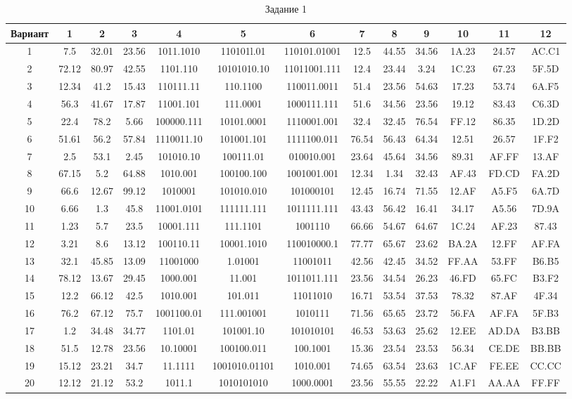 \begin{table}
  \caption{Задание 1}
  \begin{center}\label{tab:task2_1}
\begin{tabular}{|c|c|c|c|c|c|c|c|c|c|c|c|c|}
\hline
Вариант & 1 & 2 & 3 & 4 & 5 & 6 & 7 & 8 & 9 & 10 & 11 & 12\tabularnewline
\hline
1 & 7.5 & 32.01 & 23.56 & 1011.1010 & 110101l.01 & 110101.01001 & 12.5 & 44.55 & 34.56 & 1A.23 & 24.57 & AC.C1\tabularnewline
\hline
2 & 72.12 & 80.97 & 42.55 & 1101.110 & 10101010.10 & 11011001.111 & 12.4 & 23.44 & 3.24 & 1C.23 & 67.23 & 5F.5D\tabularnewline
\hline
3 & 12.34 & 41.2 & 15.43 & 110111.11 & 110.1100 & 110011.0011 & 51.4 & 23.56 & 54.63 & 17.23 & 53.74 & 6A.F5\tabularnewline
\hline
4 & 56.3 & 41.67 & 17.87 & 11001.101 & 111.0001 & 1000111.111 & 51.6 & 34.56 & 23.56 & 19.12 & 83.43 & C6.3D\tabularnewline
\hline
5 & 22.4 & 78.2 & 5.66 & 100000.111 & 10101.0001 & 1110001.001 & 32.4 & 32.45 & 76.54 & FF.12 & 86.35 & 1D.2D\tabularnewline
\hline
6 & 51.61 & 56.2 & 57.84 & 1110011.10 & 101001.101 & 1111100.011 & 76.54 & 56.43 & 64.34 & 12.51 & 26.57 & 1F.F2\tabularnewline
\hline
7 & 2.5 & 53.1 & 2.45 & 101010.10 & 100111.01 & 010010.001 & 23.64 & 45.64 & 34.56 & 89.31 & AF.FF & 13.AF\tabularnewline
\hline
8 & 67.15 & 5.2 & 64.88 & 1010.001 & 100100.100 & 1001001.001 & 12.34 & 1.34 & 32.43 & AF.43 & FD.CD & FA.2D\tabularnewline
\hline
9 & 66.6 & 12.67 & 99.12 & 1010001 & 101010.010 & 101000101 & 12.45 & 16.74 & 71.55 & 12.AF & A5.F5 & 6A.7D\tabularnewline
\hline
10 & 6.66 & 1.3 & 45.8 & 11001.0101 & 111111.111 & 1011111.111 & 43.43 & 56.42 & 16.41 & 34.17 & A5.56 & 7D.9A\tabularnewline
\hline
11 & 1.23 & 5.7 & 23.5 & 10001.111 & 111.1101 & 1001110 & 66.66 & 54.67 & 64.67 & 1C.24 & AF.23 & 87.43\tabularnewline
\hline
12 & 3.21 & 8.6 & 13.12 & 100110.11 & 10001.1010 & 110010000.1 & 77.77 & 65.67 & 23.62 & BA.2A & 12.FF & AF.FA\tabularnewline
\hline
13 & 32.1 & 45.85 & 13.09 & 11001000 & 1.01001 & 11001011 & 42.56 & 42.45 & 34.52 & FF.AA & 53.FF & B6.B5\tabularnewline
\hline
14 & 78.12 & 13.67 & 29.45 & 1000.001 & 11.001 & 1011011.111 & 23.56 & 34.54 & 26.23 & 46.FD & 65.FC & B3.F2\tabularnewline
\hline
15 & 12.2 & 66.12 & 42.5 & 1010.001 & 101.011 & 11011010 & 16.71 & 53.54 & 37.53 & 78.32 & 87.AF & 4F.34\tabularnewline
\hline
16 & 76.2 & 67.12 & 75.7 & 1001100.01 & 111.001001 & 1010111 & 71.56 & 65.65 & 23.72 & 56.FA & AF.FA & 5F.B3\tabularnewline
\hline
17 & 1.2 & 34.48 & 34.77 & 1101.01 & 101001.10 & 101010101 & 46.53 & 53.63 & 25.62 & 12.EE & AD.DA & B3.BB\tabularnewline
\hline
18 & 51.5 & 12.78 & 23.56 & 10.10001 & 100100.011 & 100.1001 & 15.36 & 23.54 & 23.53 & 56.34 & CE.DE & BB.BB\tabularnewline
\hline
19 & 15.12 & 23.21 & 34.7 & 11.1111 & 1001010.01101 & 1010.001 & 74.65 & 63.54 & 23.63 & 1C.AF & FE.EE & CC.CC\tabularnewline
\hline
20 & 12.12 & 21.12 & 53.2 & 1011.1 & 1010101010 & 1000.0001 & 23.56 & 55.55 & 22.22 & A1.F1 & AA.AA & FF.FF\tabularnewline
\hline
\end{tabular}
\end{center}
\end{table}

